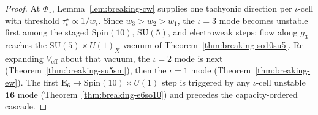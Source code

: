 \documentclass[11pt]{article}
\theoremstyle{plain}
\theoremstyle{definition}
\theoremstyle{remark}
\numberwithin{equation}{section}
\newcommand{\E}[1]{\mathrm{E}_{#1}}
\newcommand{\Spin}{\mathrm{Spin}}
\newcommand{\orderparam}{\Phi}
\begin{document}
\begin{proof}
At $\orderparam_\star$, Lemma~\ref{lem:breaking-cw} supplies one tachyonic
direction per $\iota$-cell with threshold $\tau_\iota^\star\propto 1/w_\iota$.
Since $w_3>w_2>w_1$, the $\iota=3$ mode becomes unstable first among the staged
$\Spin(10)$, $\mathrm{SU}(5)$, and electroweak steps; flow along $g_3$ reaches
the $\mathrm{SU}(5)\times U(1)_X$ vacuum of Theorem~\ref{thm:breaking-so10su5}.
Re-expanding $V_{\mathrm{eff}}$ about that vacuum, the $\iota=2$ mode is next
(Theorem~\ref{thm:breaking-su5sm}), then the $\iota=1$ mode
(Theorem~\ref{thm:breaking-ew}). The first $\E{6}\to\Spin(10)\times U(1)$ step
is triggered by any $\iota$-cell unstable $\mathbf{16}$ mode
(Theorem~\ref{thm:breaking-e6so10}) and precedes the capacity-ordered cascade.
\end{proof}
\end{document}
